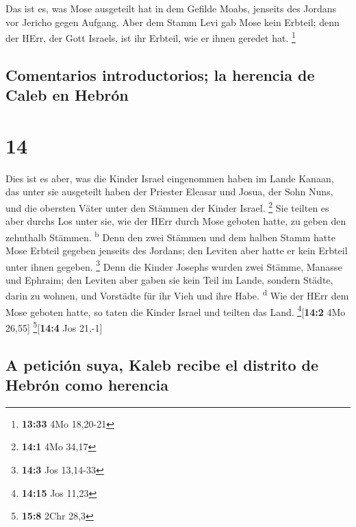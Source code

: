  Das ist es, was Mose ausgeteilt hat in dem Gefilde
Moabs, jenseits des Jordans vor Jericho gegen Aufgang. 
Aber dem Stamm Levi gab Mose kein Erbteil; denn der HErr, der Gott
Israels, ist ihr Erbteil, wie er ihnen geredet hat. \footnote{\textbf{13:33}
  4Mo 18,20-21}

\hypertarget{comentarios-introductorios-la-herencia-de-caleb-en-hebruxf3n}{%
\subsection{Comentarios introductorios; la herencia de Caleb en
Hebrón}\label{comentarios-introductorios-la-herencia-de-caleb-en-hebruxf3n}}

\hypertarget{section-13}{%
\section{14}\label{section-13}}

 Dies ist es aber, was die Kinder Israel eingenommen haben
im Lande Kanaan, das unter sie ausgeteilt haben der Priester Eleasar und
Josua, der Sohn Nuns, und die obersten Väter unter den Stämmen der
Kinder Israel. \footnote{\textbf{14:1} 4Mo 34,17}  Sie
teilten es aber durchs Los unter sie, wie der HErr durch Mose geboten
hatte, zu geben den zehnthalb Stämmen. \textsuperscript{b}
 Denn den zwei Stämmen und dem halben Stamm hatte Mose
Erbteil gegeben jenseits des Jordans; den Leviten aber hatte er kein
Erbteil unter ihnen gegeben. \footnote{\textbf{14:3} Jos 13,14-33}
 Denn die Kinder Josephs wurden zwei Stämme, Manasse und
Ephraim; den Leviten aber gaben sie kein Teil im Lande, sondern Städte,
darin zu wohnen, und Vorstädte für ihr Vieh und ihre Habe.
\textsuperscript{d}  Wie der HErr dem Mose geboten hatte,
so taten die Kinder Israel und teilten das Land.
\footnote{\textbf{14:15} Jos 11,23}{[}\textbf{14:2} 4Mo 26,55{]}
\footnote{\textbf{15:8} 2Chr 28,3}{[}\textbf{14:4} Jos 21,-1{]}

\hypertarget{a-peticiuxf3n-suya-kaleb-recibe-el-distrito-de-hebruxf3n-como-herencia}{%
\subsection{A petición suya, Kaleb recibe el distrito de Hebrón como
herencia}\label{a-peticiuxf3n-suya-kaleb-recibe-el-distrito-de-hebruxf3n-como-herencia}}

